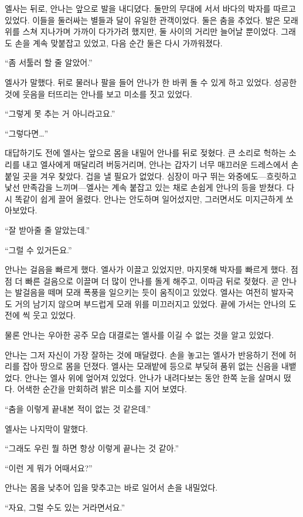 엘사는 뒤로, 안나는 앞으로 발을 내디뎠다. 둘만의 무대에 서서 바다의 박자를 따르고 있었다. 이들을 둘러싸는 별들과 달이 유일한 관객이었다. 둘은 춤을 추었다. 발은 모래 위를 스쳐 지나가며 가까이 다가가려 했지만, 둘 사이의 거리만 늘어날 뿐이었다. 그래도 손을 계속 맞붙잡고 있었고, 다음 순간 둘은 다시 가까워졌다.

``좀 서툴러 할 줄 알았어.''

엘사가 말했다. 뒤로 물러나 팔을 들어 안나가 한 바퀴 돌 수 있게 하고 있었다. 성공한 것에 웃음을 터뜨리는 안나를 보고 미소를 짓고 있었다.

``그렇게 못 추는 거 아니라고요.''

``그렇다면\ldots''

대답하기도 전에 엘사는 앞으로 몸을 내밀어 안나를 뒤로 젖혔다. 큰 소리로 헉하는 소리를 내고 엘사에게 매달리려 버둥거리며, 안나는 갑자기 너무 매끄러운 드레스에서 손 붙일 곳을 겨우 찾았다. 겁을 낼 필요가 없었다. 심장이 마구 뛰는 와중에도—흐릿하고 낯선 만족감을 느끼며—엘사는 계속 붙잡고 있는 채로 손쉽게 안나의 등을 받쳤다. 다시 똑같이 쉽게 끌어 올렸다. 안나는 안도하며 일어섰지만, 그러면서도 미지근하게 쏘아보았다.

``잘 받아줄 줄 알았는데.''

``그럴 수 있거든요.''

안나는 걸음을 빠르게 했다. 엘사가 이끌고 있었지만, 마지못해 박자를 빠르게 했다. 점점 더 빠른 걸음으로 이끌며 더 많이 안나를 돌게 해주고, 이따금 뒤로 젖혔다. 곧 안나는 발걸음을 떼며 모래 폭풍을 일으키는 듯이 움직이고 있었다. 엘사는 여전히 발자국도 거의 남기지 않으며 부드럽게 모래 위를 미끄러지고 있었다. 끝에 가서는 안나의 도전에 씩 웃고 있었다.

물론 안나는 우아한 공주 모습 대결로는 엘사를 이길 수 없는 것을 알고 있었다.

안나는 그저 자신이 가장 잘하는 것에 매달렸다. 손을 놓고는 엘사가 반응하기 전에 허리를 잡아 땅으로 몸을 던졌다. 엘사는 모래밭에 등으로 부딪혀 품위 없는 신음을 내뱉었다. 안나는 엘사 위에 엎어져 있었다. 안나가 내려다보는 동안 한쪽 눈을 살며시 떴다. 어색한 순간을 만회하려 밝은 미소를 지어 보였다.

``춤을 이렇게 끝내본 적이 없는 것 같은데.''

엘사는 나지막이 말했다.

``그래도 우린 뭘 하면 항상 이렇게 끝나는 것 같아.''

``이런 게 뭐가 어때서요?''

안나는 몸을 낮추어 입을 맞추고는 바로 일어서 손을 내밀었다.

``자요, 그럴 수도 있는 거라면서요.''

